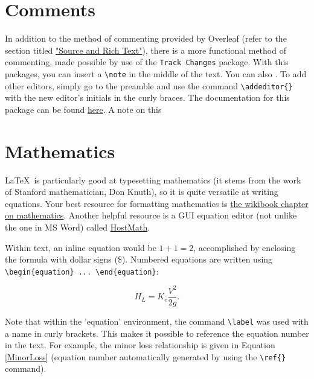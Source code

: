 \documentclass[english,12pt]{article}
\begin{document}
\section*{Comments}
In addition to the method of commenting provided by Overleaf (refer to the section titled \href{sourcevrich}{"Source and Rich Text"}), there is a more functional method of commenting, made possible by use of the \texttt{Track Changes} package. With this packages, you can insert a \texttt{\textbackslash note} in the middle of the text.  You can also .    To add other editors, simply go to the preamble and use the command \texttt{\textbackslash addeditor\{\}} with the new editor's initials in the curly braces. The documentation for this package can be found \href{http://trackchanges.sourceforge.net/}{here}. A note on this 

\section*{Mathematics}
\LaTeX \ is particularly good at typesetting mathematics (it stems from the work of Stanford mathematician, Don Knuth), so it is quite versatile at writing equations. Your best resource for formatting mathematics is \href{https://en.wikibooks.org/wiki/LaTeX/Mathematics}{the wikibook chapter on mathematics}. Another helpful resource is a GUI equation editor (not unlike the one in MS Word) called \href{http://www.hostmath.com/}{HostMath}.

Within text, an inline equation would be $1+1=2$, accomplished by enclosing the formula with dollar signs (\$).
Numbered equations are written using \texttt{\textbackslash begin\{equation\} ... \textbackslash end\{equation\}}:

\begin{equation}
H_L = K_e\frac{V^2}{2g}.
\label{MinorLoss}
\end{equation}

Note that within the 'equation' environment, the command \texttt{\textbackslash label} was used with a name in curly brackets. This makes it possible to reference the equation number in the text. For example, the minor loss relationship is given in Equation \ref{MinorLoss} (equation number automatically generated by using the \texttt{\textbackslash ref\{\}} command).
\end{document}
